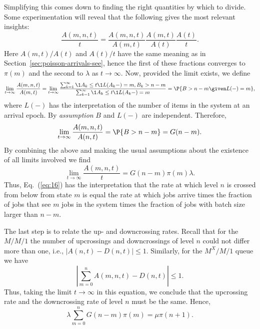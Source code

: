 Simplifying this comes down to finding the right quantities by which
to divide. Some experimentation will reveal that the following gives
the most relevant insights:
\begin{equation}\label{eq:16}
  \frac{A(m,n,t)}t =   \frac{A(m,n,t)}{A(m,t)}\frac{A(m,t)}{A(t)}\frac{A(t)}t. 
\end{equation}
Here $A(m,t)/A(t)$ and $A(t)/t$ have the same meaning as in
Section~\ref{sec:poisson-arrivals-see}, hence the first of these
fractions converges to $\pi(m)$ and the second to $\lambda$ as
$t\to\infty$. Now, provided the limit exists, we define
\begin{equation*}
\lim_{t\to\infty} \frac{A(m,n,t)}{A(m,t)} = 
\lim_{t\to\infty} \frac{\sum_{k=1}^\infty \1{A_k \leq t}\1{L(A_k-) = m, B_k > n-m}}
{\sum_{k=1}^\infty \1{A_k \leq t}\1{L(A_k-) = m}}=\P{B>n-m\given L(-)=m},
\end{equation*}
where $L(-)$ has the interpretation of the number of items in the
system at an arrival epoch.  By \emph{assumption} $B$ and $L(-)$ are
independent. Therefore,
\begin{equation*}
\lim_{t\to\infty} \frac{A(m,n,t)}{A(n,t)} = \P{B>n-m} = G(n-m).
\end{equation*} 
By combining the above and making the usual assumptions about the
existence of all limits involved we find
\begin{equation*}
\lim_{t\to\infty}   \frac{A(m,n,t)}t = G(n-m) \pi(m) \lambda.
\end{equation*}
Thus, Eq.~(\ref{eq:16}) has the interpretation that the rate at which
level $n$ is crossed from below from state $m$ is equal the rate at
which jobs arrive times the fraction of jobs that see $m$ jobs in the
system times the fraction of jobs with batch size larger than $n-m$. 


The last step is to relate the up- and downcrossing rates.  Recall
that for the $M/M/1$ the number of upcrossings and downcrossings of
level $n$ could not differ more than one, i.e.,
$|A(n,t)-D(n,t)|\leq 1$. Similarly, for the $M^X/M/1$ queue we have
 \begin{equation}\label{eq:53}
 \left|  \sum_{m=0}^n A(m,n,t) - D(n,t) \right|\leq1.
\end{equation}
Thus, taking the limit $t\to\infty$ in this equation, we conclude that
the upcrossing rate and the downcrossing rate of level $n$ must be the
same. Hence,
\begin{equation}\label{eq:42}
\lambda  \sum_{m=0}^n G(n-m) \pi(m) = \mu \pi(n+1).
\end{equation}


